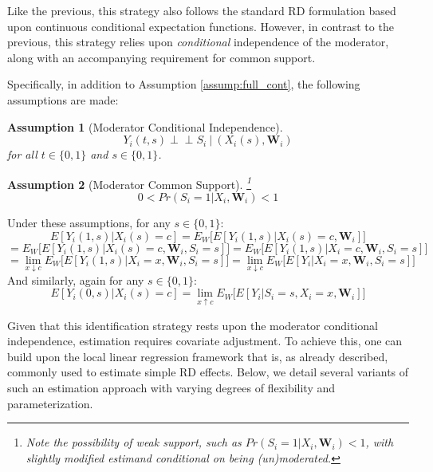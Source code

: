 \documentclass[12pt]{article}
\newtheorem{assumption}{\small\sc Assumption}
\newcommand{\indep}{\perp\!\!\!\!\perp}
\begin{document}
Like the previous, this strategy also follows the standard RD formulation based upon continuous conditional expectation functions. However, in contrast to the previous, this strategy relies upon \emph{conditional} independence of the moderator, along with an accompanying requirement for common support. 

Specifically, in addition to Assumption \ref{assump:full_cont}, the following assumptions are made:


\begin{assumption}[Moderator Conditional Independence] \label{assump:mod_cond_indep}
$$Y_i(t,s) \indep S_i \: | \: (X_i(s), \bm{W}_i)$$
for all $t \in \{ 0, 1\}$ and $s \in \{ 0, 1\}$.
\end{assumption}

\begin{assumption}[Moderator Common Support]\footnote{Note the possibility of weak support, such as $Pr(S_i = 1 | X_i, \bm{W}_i) < 1$, with slightly modified estimand conditional on being (un)moderated.} \label{assump:mod_supp}
$$0 < Pr(S_i = 1 | X_i, \bm{W}_i) < 1$$
\end{assumption}
Under these assumptions, for any $s \in \{ 0,1 \}$:
$$E[Y_i(1,s) | X_i(s) = c] =  E_W \big[ E[Y_i(1,s) | X_i(s) = c, \bm{W}_i] \big]$$
$$=  E_W \big[ E[Y_i(1,s) | X_i(s) = c, \bm{W}_i, S_i = s] \big] =  E_W \big[ E[Y_i(1,s) | X_i = c, \bm{W}_i, S_i = s] \big]$$
$$=  \lim_{x \downarrow c} E_W \big[ E[Y_i(1,s) | X_i = x, \bm{W}_i, S_i = s] \big] =  \lim_{x \downarrow c} E_W \big[ E[Y_i | X_i = x, \bm{W}_i, S_i = s] \big]$$
And similarly, again for any $s \in \{ 0,1 \}$:
$$E[Y_i(0,s) | X_i(s) = c] = \lim_{x \uparrow c} E_W \big[ E[Y_i | S_i = s, X_i = x, \bm{W}_i] \big]$$

Given that this identification strategy rests upon the moderator conditional independence, estimation requires covariate adjustment. To achieve this, one can build upon the local linear regression framework that is, as already described, commonly used to estimate simple RD effects. Below, we detail several variants of such an estimation approach with varying degrees of flexibility and parameterization. \\
\end{document}
